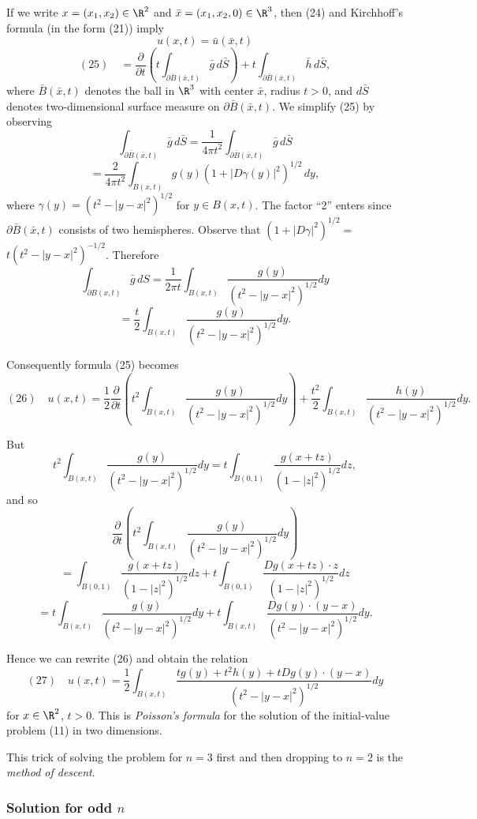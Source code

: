 If we write $x=(x_1,x_2) \in \R^2$ and $\bar{x}=(x_1,x_2,0)\in\R^3$, then (24) and Kirchhoff's formula (in the form (21)) imply
$$u(x,t) = \bar{u}(\bar{x},t)$$
$$(25) \quad = \frac{\partial}{\partial t}\left(t\int_{\partial\bar{B}(\bar{x},t)} \bar{g}\,d\bar{S}\right) + t\int_{\partial\bar{B}(\bar{x},t)} \bar{h}\,d\bar{S},$$
where $\bar{B}(\bar{x},t)$ denotes the ball in $\R^3$ with center $\bar{x}$, radius $t>0$, and $d\bar{S}$ denotes two-dimensional surface measure on $\partial\bar{B}(\bar{x},t)$. We simplify (25) by observing
$$\int_{\partial\bar{B}(\bar{x},t)} \bar{g}\,d\bar{S} = \frac{1}{4\pi t^2}\int_{\partial\bar{B}(\bar{x},t)} \bar{g}\,d\bar{S}$$
$$= \frac{2}{4\pi t^2}\int_{B(x,t)} g(y)(1+|D\gamma(y)|^2)^{1/2}\,dy,$$
where $\gamma(y) = (t^2-|y-x|^2)^{1/2}$ for $y \in B(x,t)$. The factor ``2'' enters since $\partial\bar{B}(\bar{x},t)$ consists of two hemispheres. Observe that $(1+|D\gamma|^2)^{1/2} =$
$t(t^2 - |y - x|^2)^{-1/2}$. Therefore
$$\int_{\partial B(x,t)} \bar{g} \, dS = \frac{1}{2\pi t} \int_{B(x,t)} \frac{g(y)}{(t^2 - |y - x|^2)^{1/2}} dy$$
$$= \frac{t}{2} \int_{B(x,t)} \frac{g(y)}{(t^2 - |y - x|^2)^{1/2}} dy.$$

Consequently formula (25) becomes
$$(26) \quad u(x, t) = \frac{1}{2} \frac{\partial}{\partial t} \left( t^2 \int_{B(x,t)} \frac{g(y)}{(t^2 - |y - x|^2)^{1/2}} dy \right) + \frac{t^2}{2} \int_{B(x,t)} \frac{h(y)}{(t^2 - |y - x|^2)^{1/2}} dy.$$

But
$$t^2 \int_{B(x,t)} \frac{g(y)}{(t^2 - |y - x|^2)^{1/2}} dy = t \int_{B(0,1)} \frac{g(x + tz)}{(1 - |z|^2)^{1/2}} dz,$$
and so
$$\frac{\partial}{\partial t} \left( t^2 \int_{B(x,t)} \frac{g(y)}{(t^2 - |y - x|^2)^{1/2}} dy \right)$$
$$= \int_{B(0,1)} \frac{g(x + tz)}{(1 - |z|^2)^{1/2}} dz + t \int_{B(0,1)} \frac{Dg(x + tz) \cdot z}{(1 - |z|^2)^{1/2}} dz$$
$$= t \int_{B(x,t)} \frac{g(y)}{(t^2 - |y - x|^2)^{1/2}} dy + t \int_{B(x,t)} \frac{Dg(y) \cdot (y - x)}{(t^2 - |y - x|^2)^{1/2}} dy.$$

Hence we can rewrite (26) and obtain the relation
$$(27) \quad u(x, t) = \frac{1}{2} \int_{B(x,t)} \frac{tg(y) + t^2h(y) + tDg(y) \cdot (y - x)}{(t^2 - |y - x|^2)^{1/2}} dy$$
for $x \in \R^2$, $t > 0$. This is \textit{Poisson's formula} for the solution of the initial-value problem (11) in two dimensions.

This trick of solving the problem for $n = 3$ first and then dropping to $n = 2$ is the \textit{method of descent}.

\subsubsection{Solution for odd $n$}
\label{sec:wave-solution-odd-n}

